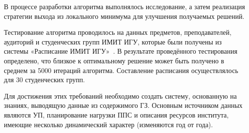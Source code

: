\documentclass[
]{aiitart}
\begin{document}
В процессе разработки алгоритма выполнялось исследование, а затем реализация стратегии выхода из локального минимума для улучшения получаемых решений.

Тестирование алгоритма проводилось на данных предметов, преподавателей, аудиторий и студенческих групп ИМИТ ИГУ, которые были получены из системы «Расписание ИМИТ ИГУ»~\cite{raspmath}. В результате проведённого тестирования определено, что близкое к оптимальному решение может быть получено в среднем за 5000 итераций алгоритма. Составление расписания осуществлялось для 30 студенческих групп.









Для достижения этих требований необходимо создать систему, основанную на знаниях, выводящую данные из содержимого ГЗ. Основным источником данных являются УП, планирование нагрузки ППС и описания ресурсов института, имеющие несколько динамический характер (изменяются год от года).
\end{document}
